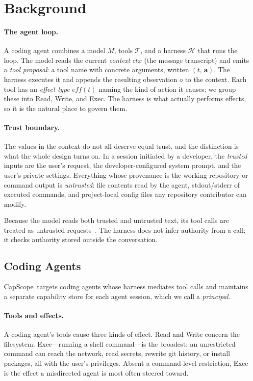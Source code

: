 \documentclass[sigplan,review,anonymous]{acmart}
\newcommand{\tool}{CapScope\xspace}
\begin{document}
  \section{Background}
  \label{sec:background}
  \paragraph{The agent loop.}
  A coding agent combines a model $M$, tools $\mathcal{T}$, and a harness
  $\mathcal{H}$ that runs the loop. The model reads the current \emph{context} $\mathit{ctx}$
  (the message transcript) and emits a \emph{tool proposal}: a tool name with
  concrete arguments, written $(t,\,\mathbf{a})$. The harness executes it and
  appends the resulting observation $o$ to the context. Each tool has an
  \emph{effect type} $\mathit{eff}(t)$ naming the kind of action it causes;
  we group these into \textsf{Read}, \textsf{Write}, and \textsf{Exec}. The
  harness is what actually performs effects, so it
  is the natural place to govern them.

  \paragraph{Trust boundary.}
  \label{def:integrity}
  The values in the context do not all deserve equal trust, and the
  distinction is what the whole design turns on.
  In a session initiated by a developer, the \emph{trusted} inputs are the
  user's request, the developer-configured system prompt, and the user's
  private settings. Everything whose provenance is the working repository or
  command output is \emph{untrusted}: file contents read by the agent,
  stdout/stderr of executed commands, and project-local config files any
  repository contributor can modify.

  Because the model reads both trusted and untrusted text, its tool calls are
  treated as untrusted requests~\cite{liu2025youraishell}. The harness does not
  infer authority from a call; it checks authority stored outside the
  conversation.

  \subsection{Coding Agents}
  \label{sec:agents}
  \tool\ targets coding agents whose harness mediates tool calls and maintains
  a separate capability store for each agent session, which we call a
  \emph{principal}.

  \paragraph{Tools and effects.}
  A coding agent's tools cause three kinds of effect. \textsf{Read} and
  \textsf{Write} concern the filesystem. \textsf{Exec}---running a shell
  command---is the broadest: an unrestricted command can reach the network, read
  secrets, rewrite git history, or install packages, all with the user's
  privileges. Absent a command-level restriction, \textsf{Exec} is the effect a
  misdirected agent is most often steered toward.
\end{document}
